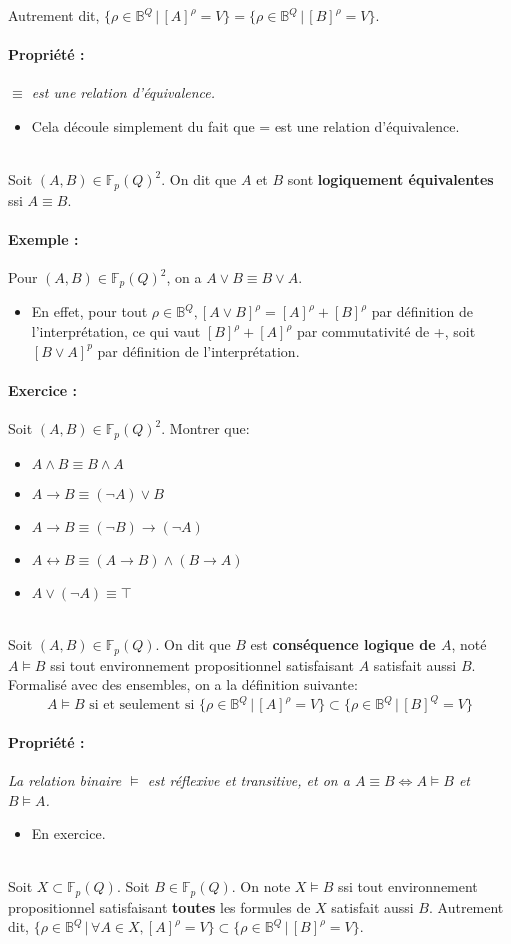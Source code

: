 \documentclass{scrartcl}
\newcounter{compteurExos}
\newcommand{\prop}[1]{\paragraph{Propriété : } \textsl{#1}\\}
\newcommand{\exemple}[1]{\paragraph{Exemple : } #1\\}
\newcommand{\exo}[1]{\stepcounter{compteurExos} \paragraph{Exercice \thecompteurExos : } #1\\}
\newenvironment{demo}{\begin{itemize}[label=$\triangleright$]\item }{\end{itemize}}
\newcommand{\fpq}{\mathbb{F}_p(Q)}
\newcommand{\set}[1]{\{#1\}}
\newcommand{\tq}{\, \big| \,}
\begin{document}
			Autrement dit, $\set{\rho \in \mathbb{B}^Q \tq [A]^\rho = V} = \set{\rho \in \mathbb{B}^Q \tq [B]^\rho = V}$.

			\prop{$\equiv$ est une relation d'équivalence.}
			\begin{demo}
				Cela découle simplement du fait que = est une relation d'équivalence.
			\end{demo}
			~\\
			{\parindent0pt Soit $(A,B) \in \mathbb{F}_p(Q)^2$. On dit que $A$ et $B$ sont \textbf{logiquement équivalentes} ssi $A \equiv B$.}

			\exemple{Pour $(A,B) \in \mathbb{F}_p(Q)^2$, on a $A\vee B \equiv B \vee A$.}
			\begin{demo}
				En effet, pour tout $\rho \in \mathbb{B}^Q, [A\vee B]^\rho = [A]^\rho + [B]^\rho$ par définition de l'interprétation, 
				ce qui vaut $[B]^\rho + [A]^\rho$ par commutativité de +, soit $[B\vee A]^p$ par définition de l'interprétation.
			\end{demo}

			\exo{Soit $(A,B) \in \mathbb{F}_p(Q)^2$. Montrer que:}
			\begin{itemize}
				\item $A \wedge B \equiv B \wedge A$
				\item $A \rightarrow B \equiv (\neg A) \vee B$
				\item $A \rightarrow B \equiv (\neg B) \rightarrow (\neg A)$
				\item $A \leftrightarrow B \equiv (A \rightarrow B) \wedge (B \rightarrow A)$ 
				\item $A \vee (\neg A) \equiv \top$
			\end{itemize}
			
			~\\
			Soit $(A,B) \in \fpq$. On dit que $B$ est \textbf{conséquence logique de $A$}, noté $A \vDash B$ ssi tout environnement propositionnel satisfaisant $A$ satisfait aussi $B$.
			Formalisé avec des ensembles, on a la définition suivante:
			\[ A \vDash B \text{ si et seulement si } \set{\rho \in \mathbb{B}^Q \tq [A]^\rho = V} \subset \set{\rho \in \mathbb{B}^Q \tq [B]^Q = V} \]

			\prop{La relation binaire $\vDash$ est réflexive et transitive, et on a $A\equiv B \Leftrightarrow A \vDash B$ et $B \vDash A$.}
			\begin{demo}
				En exercice.
			\end{demo}
			~\\
			Soit $X \subset \fpq$. Soit $B \in \fpq$.
			On note $X \vDash B$ ssi tout environnement propositionnel satisfaisant \textbf{toutes} les formules de $X$ satisfait aussi $B$.
			Autrement dit, $\set{\rho \in \mathbb{B}^Q \tq \forall A \in X , [A]^\rho = V} \subset \set{\rho \in \mathbb{B}^Q \tq [B]^\rho = V}$.
			
\end{document}
